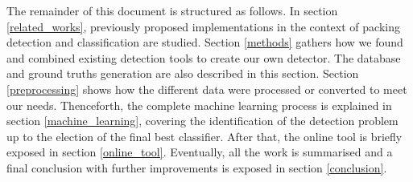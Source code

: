 The remainder of this document is structured as follows. In section \ref{related_works}, previously proposed implementations in the context of packing detection and classification are studied. Section \ref{methods} gathers how we found and combined existing detection tools to create our own detector. The database and ground truths generation are also described in this section. Section \ref{preprocessing} shows how the different data were processed or converted to meet our needs. Thenceforth, the complete machine learning process is explained in section \ref{machine_learning}, covering the identification of the detection problem up to the election of the final best classifier. After that, the online tool is briefly exposed in section \ref{online_tool}. Eventually, all the work is summarised and a final conclusion with further improvements is exposed in section \ref{conclusion}.